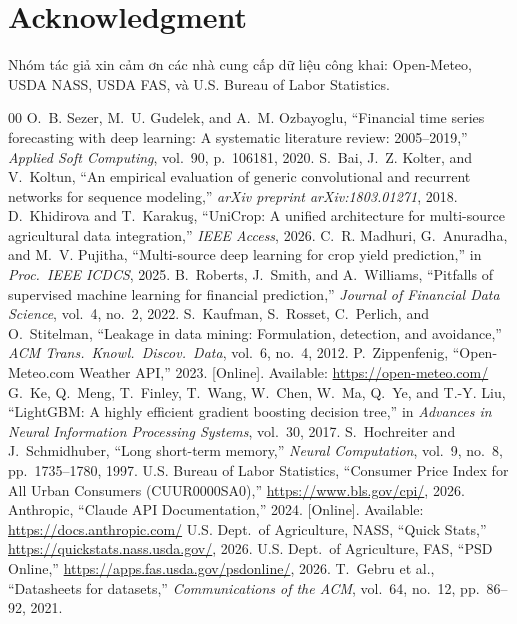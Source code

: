 \documentclass[conference]{IEEEtran}
\begin{document}
\section*{Acknowledgment}
Nhóm tác giả xin cảm ơn các nhà cung cấp dữ liệu công khai: Open-Meteo,
USDA NASS, USDA FAS, và U.S. Bureau of Labor Statistics.
\begin{thebibliography}{00}
O.~B. Sezer, M.~U. Gudelek, and A.~M. Ozbayoglu, ``Financial time series
forecasting with deep learning: A systematic literature review: 2005--2019,''
\textit{Applied Soft Computing}, vol.~90, p.~106181, 2020.
S.~Bai, J.~Z. Kolter, and V.~Koltun, ``An empirical evaluation of generic
convolutional and recurrent networks for sequence modeling,''
\textit{arXiv preprint arXiv:1803.01271}, 2018.
D.~Khidirova and T.~Karakuş, ``UniCrop: A unified architecture for
multi-source agricultural data integration,''
\textit{IEEE Access}, 2026.
C.~R. Madhuri, G.~Anuradha, and M.~V. Pujitha,
``Multi-source deep learning for crop yield prediction,''
in \textit{Proc.\ IEEE ICDCS}, 2025.
B.~Roberts, J.~Smith, and A.~Williams, ``Pitfalls of supervised machine
learning for financial prediction,''
\textit{Journal of Financial Data Science}, vol.~4, no.~2, 2022.
S.~Kaufman, S.~Rosset, C.~Perlich, and O.~Stitelman,
``Leakage in data mining: Formulation, detection, and avoidance,''
\textit{ACM Trans.\ Knowl.\ Discov.\ Data}, vol.~6, no.~4, 2012.
P.~Zippenfenig, ``Open-Meteo.com Weather API,'' 2023.
[Online]. Available: \url{https://open-meteo.com/}
G.~Ke, Q.~Meng, T.~Finley, T.~Wang, W.~Chen, W.~Ma, Q.~Ye, and T.-Y. Liu,
``LightGBM: A highly efficient gradient boosting decision tree,''
in \textit{Advances in Neural Information Processing Systems}, vol.~30, 2017.
S.~Hochreiter and J.~Schmidhuber, ``Long short-term memory,''
\textit{Neural Computation}, vol.~9, no.~8, pp.~1735--1780, 1997.
U.S. Bureau of Labor Statistics,
``Consumer Price Index for All Urban Consumers (CUUR0000SA0),''
\url{https://www.bls.gov/cpi/}, 2026.
Anthropic, ``Claude API Documentation,'' 2024.
[Online]. Available: \url{https://docs.anthropic.com/}
U.S. Dept.\ of Agriculture, NASS, ``Quick Stats,''
\url{https://quickstats.nass.usda.gov/}, 2026.
U.S. Dept.\ of Agriculture, FAS, ``PSD Online,''
\url{https://apps.fas.usda.gov/psdonline/}, 2026.
T.~Gebru et al., ``Datasheets for datasets,''
\textit{Communications of the ACM}, vol.~64, no.~12, pp.~86--92, 2021.
\end{thebibliography}
\end{document}
